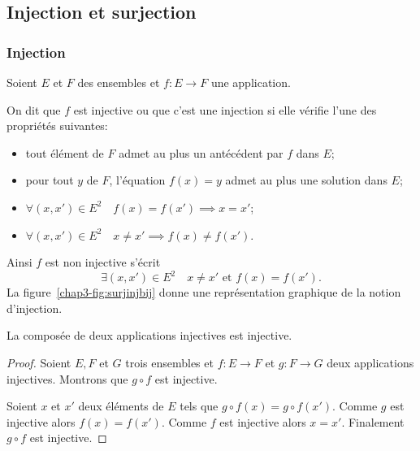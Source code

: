 \subsection{Injection et surjection}
\label{chap3-subsec:injetsurj}
\subsubsection{Injection}
\label{chap3-subsubsec:injection}
Soient \(E\) et \(F\) des ensembles et \(f: E \longrightarrow F\) une application.
\begin{defdef}
  On dit que \(f\) est injective ou que c'est une injection si elle vérifie l'une des propriétés suivantes:
  \begin{itemize}
  \item tout élément de \(F\) admet au plus un antécédent par \(f\) dans \(E\);
  \item pour tout \(y\) de \(F\), l'équation \(f(x)=y\) admet au plus une solution dans \(E\);
  \item \(\forall (x,x') \in E^2 \quad f(x)=f(x') \implies x=x'\);
  \item \(\forall (x,x') \in E^2 \quad  x \neq x' \implies f(x) \neq f(x')\).
  \end{itemize}
  Ainsi \(f\) est non injective s'écrit
  \begin{equation}
    \exists (x,x') \in E^2 \quad x \neq x' \text{~et~} f(x) = f(x').
  \end{equation}
  La figure~\ref{chap3-fig:surjinjbij} donne une représentation graphique de la notion d'injection.
\end{defdef}
\begin{theo}
  La composée de deux applications injectives est injective.
\end{theo}
\begin{proof}
  Soient \(E,F\) et \(G\) trois ensembles et \(f:E \longrightarrow F\) et \(g: F \longrightarrow G\) deux applications injectives. Montrons que \(g \circ f\) est injective. 

Soient \(x\) et \(x'\) deux éléments de \(E\) tels que \(g \circ f(x) = g \circ f(x')\). Comme \(g\) est injective alors \(f(x)=f(x')\). Comme \(f\) est injective alors \(x=x'\). Finalement \(g \circ f\) est injective.
\end{proof}

